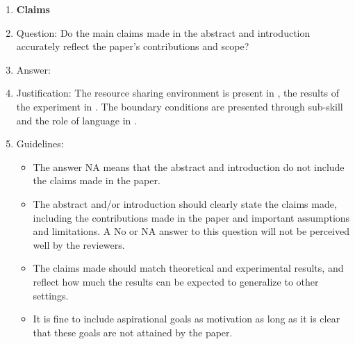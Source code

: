 \documentclass{article}
\begin{document}
%
%
%

%
%
%
%
%
%
%

%

%

%
%
%
%
%
%
 

%


\begin{enumerate}

\item {\bf Claims}
    \item[] Question: Do the main claims made in the abstract and introduction accurately reflect the paper's contributions and scope?
    \item[] Answer: \answerYes{} %
    \item[] Justification: The resource sharing environment is present in , the results of the experiment in . The boundary conditions are presented through sub-skill  and the role of language in  .
    \item[] Guidelines:
    \begin{itemize}
        \item The answer NA means that the abstract and introduction do not include the claims made in the paper.
        \item The abstract and/or introduction should clearly state the claims made, including the contributions made in the paper and important assumptions and limitations. A No or NA answer to this question will not be perceived well by the reviewers. 
        \item The claims made should match theoretical and experimental results, and reflect how much the results can be expected to generalize to other settings. 
        \item It is fine to include aspirational goals as motivation as long as it is clear that these goals are not attained by the paper. 
    \end{itemize}


\end{enumerate}
\end{document}
